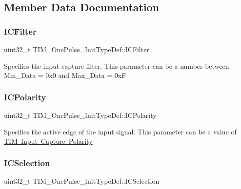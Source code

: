 \subsection{Member Data Documentation}
\mbox{\label{struct_t_i_m___one_pulse___init_type_def_a883e69dec14d8bde9914906be1b04ad7}} 
\subsubsection{\texorpdfstring{ICFilter}{ICFilter}}
{\footnotesize\ttfamily uint32\+\_\+t T\+I\+M\+\_\+\+One\+Pulse\+\_\+\+Init\+Type\+Def\+::\+I\+C\+Filter}

Specifies the input capture filter. This parameter can be a number between Min\+\_\+\+Data = 0x0 and Max\+\_\+\+Data = 0xF \mbox{\label{struct_t_i_m___one_pulse___init_type_def_a8589cf95218ea62604b845054b36b772}} 
\subsubsection{\texorpdfstring{ICPolarity}{ICPolarity}}
{\footnotesize\ttfamily uint32\+\_\+t T\+I\+M\+\_\+\+One\+Pulse\+\_\+\+Init\+Type\+Def\+::\+I\+C\+Polarity}

Specifies the active edge of the input signal. This parameter can be a value of \mbox{\hyperlink{group___t_i_m___input___capture___polarity}{T\+IM Input Capture Polarity}} \mbox{\label{struct_t_i_m___one_pulse___init_type_def_a9e8853f17e85393a869aa2ecb315f030}} 
\subsubsection{\texorpdfstring{ICSelection}{ICSelection}}
{\footnotesize\ttfamily uint32\+\_\+t T\+I\+M\+\_\+\+One\+Pulse\+\_\+\+Init\+Type\+Def\+::\+I\+C\+Selection}

